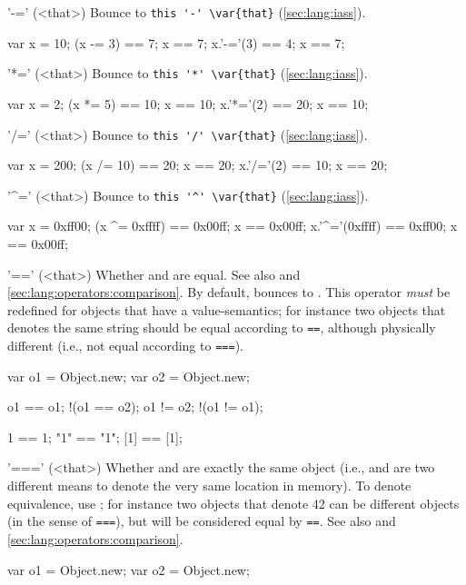 \begin{urbiscriptapi}
\item['-='](<that>)%
  Bounce to \lstinline|this '-' \var{that}| (\autoref{sec:lang:iass}).
\begin{urbiassert}
var x = 10;
(x -= 3)  == 7;  x == 7;
x.'-='(3) == 4;  x == 7;
\end{urbiassert}


\item['*='](<that>)%
  Bounce to \lstinline|this '*' \var{that}| (\autoref{sec:lang:iass}).
\begin{urbiassert}
var x = 2;
(x *= 5)  == 10;  x == 10;
x.'*='(2) == 20;  x == 10;
\end{urbiassert}


\item['/='](<that>)%
  Bounce to \lstinline|this '/' \var{that}| (\autoref{sec:lang:iass}).
\begin{urbiassert}
var x = 200;
(x /= 10) == 20;  x == 20;
x.'/='(2) == 10;  x == 20;
\end{urbiassert}


\item['^='](<that>)%
  Bounce to \lstinline|this '^' \var{that}| (\autoref{sec:lang:iass}).
\begin{urbiassert}
var x = 0xff00;
(x ^= 0xffff)  == 0x00ff;  x == 0x00ff;
x.'^='(0xffff) == 0xff00;  x == 0x00ff;
\end{urbiassert}



\item['=='](<that>)%
  Whether \this and \that are equal.  See also  and
  \autoref{sec:lang:operators:comparison}.  By default, bounces to
  .  This operator \emph{must} be redefined for objects that
  have a value-semantics; for instance two  objects that
  denotes the same string should be equal according to \lstinline|==|,
  although physically different (i.e., not equal according to
  \lstinline|===|).
\begin{urbiassert}
var o1 = Object.new;
var o2 = Object.new;

      o1 == o1;
    !(o1 == o2);
      o1 != o2;
    !(o1 != o1);

      1  ==  1;
     "1" == "1";
     [1] == [1];
\end{urbiassert}

\item['==='](<that>)%
  Whether \this and \that are exactly the same object (i.e., \this and \that
  are two different means to denote the very same location in memory).  To
  denote equivalence, use ; for instance two 
  objects that denote 42 can be different objects (in the sense of
  \lstinline|===|), but will be considered equal by \lstinline|==|.  See
  also  and \autoref{sec:lang:operators:comparison}.
\begin{urbiassert}
var o1 = Object.new;
var o2 = Object.new;


\end{urbiassert}
\end{urbiscriptapi}
